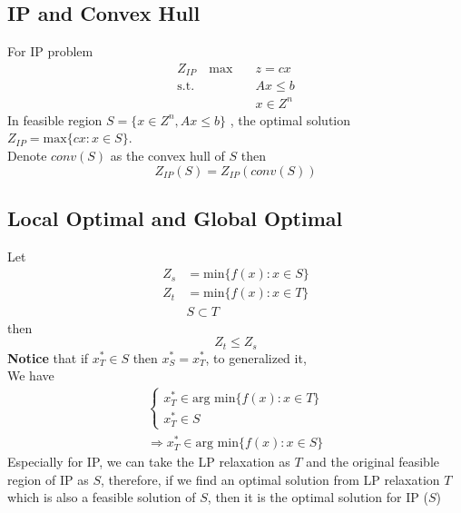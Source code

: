 			\subsection{IP and Convex Hull}
				For IP problem
				\begin{align}
					Z_{IP} \quad \text{max} \quad &z = cx  \\
							\text{s.t.} &Ax \le b \\
									&x\in {Z^n} 
				\end{align}
				In feasible region $S = \{x\in Z^n, Ax\le b\}$ , the optimal solution $Z_{IP} = \text{max}\{cx: x\in S\}$.\\
				Denote $conv(S)$ as the convex hull of $S$ then\\
				\begin{equation}Z_{IP}(S) = Z_{IP}(conv(S))  \end{equation}

			\subsection{Local Optimal and Global Optimal}
				Let 
				\begin{align}
					Z_s &= \text{min} \{f(x):x\in S\} \\
					Z_t &= \text{min} \{f(x):x\in T\}  \\
					& S \subset T 
				\end{align}
				then\\
				\begin{equation}Z_t \le Z_s  \end{equation}
				\textbf{Notice} that if $x_T^* \in S$ then $x_S^*=x_T^*$, to generalized it, \\
				We have
				\begin{align}
					\begin{cases}x_T^* \in \text{arg min} \{f(x): x\in T\} \\ x_T^* \in S\end{cases} \\ \Rightarrow x_T^*\in \text{arg min} \{f(x): x\in S\} 
				\end{align}
				Especially for IP, we can take the LP relaxation as $T$ and the original feasible region of IP as $S$, therefore, if we find an optimal solution from LP relaxation $T$ which is also a feasible solution of $S$, then it is the optimal solution for IP ($S$)

